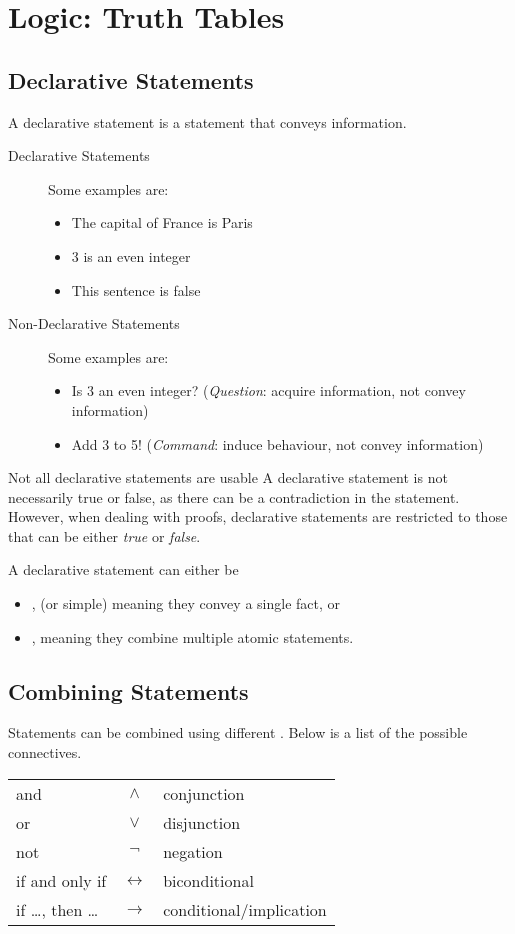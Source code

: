 \documentclass[../notes.tex]{subfiles}
\begin{document}
	\ifSubfilesClassLoaded{\setcounter{chapter}{8}}{}
	\chapter{Logic: Truth Tables}
		\section{Declarative Statements}
			A declarative statement is a statement that conveys information.
			\begin{description}
				\item[Declarative Statements] Some examples are:
					\begin{itemize}[nosep]
						\item The capital of France is Paris
						\item 3 is an even integer
						\item This sentence is false
					\end{itemize}
				\item[Non-Declarative Statements] Some examples are:
					\begin{itemize}[nosep]
						\item Is 3 an even integer? (\emph{Question}: acquire information, not convey information)
						\item Add 3 to 5! (\emph{Command}: induce behaviour, not convey information)
					\end{itemize}
			\end{description}
			\begin{sidenote}{Not all declarative statements are usable}
				A declarative statement is not necessarily true or false, as there can be a contradiction in the statement.\\
				However, when dealing with proofs, declarative statements are restricted to those that can be either \emph{true} or \emph{false}.
			\end{sidenote}
			A declarative statement can either be
			\begin{itemize}[nosep]
				\item {}, (or simple) meaning they convey a single fact, or
				\item {}, meaning they combine multiple atomic statements.
			\end{itemize}
		\section{Combining Statements}
			Statements can be combined using different . Below is a list of the possible connectives.
			\begin{center}
				\begin{tabular}{l c l}
					and & $\land$ & conjunction\\
					or & $\lor$ & disjunction\\
					not & $\lnot $ & negation\\
					if and only if & $\leftrightarrow$ & biconditional\\
					if \ldots, then \ldots & $\rightarrow$ & conditional/implication
				\end{tabular}
			\end{center}
\end{document}
